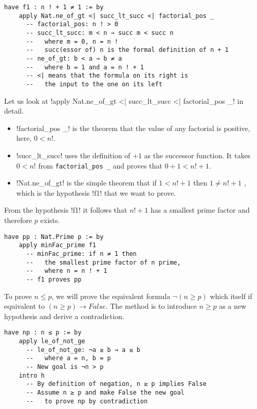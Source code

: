 \begin{Verbatim}[firstnumber=last]
  have f1 : n ! + 1 ≠ 1 := by
    apply Nat.ne_of_gt <| succ_lt_succ <| factorial_pos _
      -- factorial_pos: n ! > 0
      -- succ_lt_succ: m < n → succ m < succ n
      --   where m = 0, n = n !
      --   succ(essor of) n is the formal definition of n + 1
      -- ne_of_gt: b < a → b ≠ a
      --   where b = 1 and a = n ! + 1
      -- <| means that the formula on its right is
      --   the input to the one on its left
\end{Verbatim}

Let us look at 
!apply Nat.ne_of_gt <| succ_lt_succ <| factorial_pos _! in detail.
\begin{itemize}
\item !factorial_pos _! is the theorem that the value of any factorial is positive, here, \UndefineShortVerb{\!}$0<n!$\DefineShortVerb{\!}.

\item !succ_lt_succ! uses the definition of $+1$ as the successor function. It takes 
\UndefineShortVerb{\!}$0<n!$ from \Verb+factorial_pos _+ and proves that $0+1<n!+1$\DefineShortVerb{\!}.

\item !Nat.ne_of_gt! is the simple theorem that if
\UndefineShortVerb{\!}$1<n!+1$ then $1\neq n!+1$ \DefineShortVerb{\!}, which is the hypothesis !f1! that we want to prove.
\end{itemize}


From the hypothesis !f1! it follows that \UndefineShortVerb{\!}$n!+1$\DefineShortVerb{\!} has a smallest prime factor and therefore $p$ exists.

\begin{Verbatim}[firstnumber=last]
  have pp : Nat.Prime p := by
    apply minFac_prime f1
      -- minFac_prime: if n ≠ 1 then
      --   the smallest prime factor of n prime,
      --   where n = n ! + 1
      -- f1 proves pp
\end{Verbatim}

To prove $n\leq p$, we will prove the equivalent formula $\neg (n \geq p)$ which itself if equivalent to $(n\geq p) \rightarrow \mathit{False}$. The method is to introduce $n\geq p$ as a new hypothesis and derive a contradiction.

\begin{Verbatim}[firstnumber=last]
  have np : n ≤ p := by
    apply le_of_not_ge
      -- le_of_not_ge: ¬a ≥ b → a ≤ b
      --   where a = n, b = p
      -- New goal is ¬n > p
    intro h
      -- By definition of negation, n ≥ p implies False
      -- Assume n ≥ p and make False the new goal
      --   to prove np by contradiction
\end{Verbatim}

